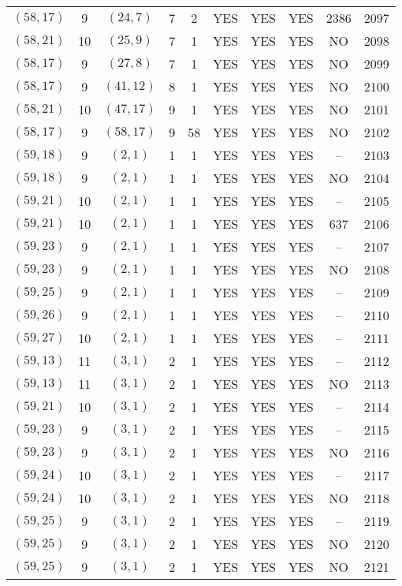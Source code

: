 \begin{longtable}{|c|c|c|c|c|c|c|c|c|c|}
$(58, 17)$ & 9 & $(24, 7)$ & 7 & 2 & YES & YES & YES & 2386 & 2097\\
$(58, 21)$ & 10 & $(25, 9)$ & 7 & 1 & YES & YES & YES & NO & 2098\\
$(58, 17)$ & 9 & $(27, 8)$ & 7 & 1 & YES & YES & YES & NO & 2099\\
$(58, 17)$ & 9 & $(41, 12)$ & 8 & 1 & YES & YES & YES & NO & 2100\\
$(58, 21)$ & 10 & $(47, 17)$ & 9 & 1 & YES & YES & YES & NO & 2101\\
$(58, 17)$ & 9 & $(58, 17)$ & 9 & 58 & YES & YES & YES & NO & 2102\\
$(59, 18)$ & 9 & $(2, 1)$ & 1 & 1 & YES & YES & YES & -- & 2103\\
$(59, 18)$ & 9 & $(2, 1)$ & 1 & 1 & YES & YES & YES & NO & 2104\\
$(59, 21)$ & 10 & $(2, 1)$ & 1 & 1 & YES & YES & YES & -- & 2105\\
$(59, 21)$ & 10 & $(2, 1)$ & 1 & 1 & YES & YES & YES & 637 & 2106\\
$(59, 23)$ & 9 & $(2, 1)$ & 1 & 1 & YES & YES & YES & -- & 2107\\
$(59, 23)$ & 9 & $(2, 1)$ & 1 & 1 & YES & YES & YES & NO & 2108\\
$(59, 25)$ & 9 & $(2, 1)$ & 1 & 1 & YES & YES & YES & -- & 2109\\
$(59, 26)$ & 9 & $(2, 1)$ & 1 & 1 & YES & YES & YES & -- & 2110\\
$(59, 27)$ & 10 & $(2, 1)$ & 1 & 1 & YES & YES & YES & -- & 2111\\
$(59, 13)$ & 11 & $(3, 1)$ & 2 & 1 & YES & YES & YES & -- & 2112\\
$(59, 13)$ & 11 & $(3, 1)$ & 2 & 1 & YES & YES & YES & NO & 2113\\
$(59, 21)$ & 10 & $(3, 1)$ & 2 & 1 & YES & YES & YES & -- & 2114\\
$(59, 23)$ & 9 & $(3, 1)$ & 2 & 1 & YES & YES & YES & -- & 2115\\
$(59, 23)$ & 9 & $(3, 1)$ & 2 & 1 & YES & YES & YES & NO & 2116\\
$(59, 24)$ & 10 & $(3, 1)$ & 2 & 1 & YES & YES & YES & -- & 2117\\
$(59, 24)$ & 10 & $(3, 1)$ & 2 & 1 & YES & YES & YES & NO & 2118\\
$(59, 25)$ & 9 & $(3, 1)$ & 2 & 1 & YES & YES & YES & -- & 2119\\
$(59, 25)$ & 9 & $(3, 1)$ & 2 & 1 & YES & YES & YES & NO & 2120\\
$(59, 25)$ & 9 & $(3, 1)$ & 2 & 1 & YES & YES & YES & NO & 2121\\

\end{longtable}
